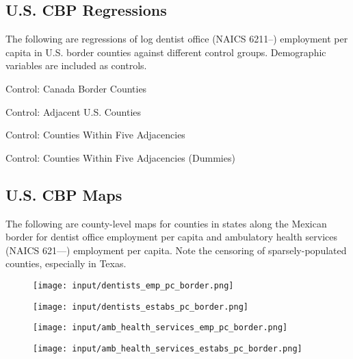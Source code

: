 \subsection{U.S. CBP Regressions}
The following are regressions of log dentist office (NAICS 6211--) employment per capita in U.S. border counties against different control groups.
Demographic variables are included as controls.

\begin{table}[H]
	\caption{Control: Canada Border Counties}
	\centering

\end{table}

\begin{table}[H]
	\caption{Control: Adjacent U.S. Counties}
	\centering

\end{table}

\begin{table}[H]
	\caption{Control: Counties Within Five Adjacencies}
	\centering

\end{table}

\begin{table}[H]
	\caption{Control: Counties Within Five Adjacencies (Dummies)}
	\centering

\end{table}

\subsection{U.S. CBP Maps}
The following are county-level maps for counties in states along the Mexican border for dentist office employment per capita and ambulatory health services (NAICS 621---) employment per capita.
Note the censoring of sparsely-populated counties, especially in Texas.

\begin{figure}[H]
	\centering
	\texttt{[image: input/dentists\_emp\_pc\_border.png]}
\end{figure}

\begin{figure}[H]
	\centering
	\texttt{[image: input/dentists\_estabs\_pc\_border.png]}
\end{figure}

\begin{figure}[H]
	\centering
	\texttt{[image: input/amb\_health\_services\_emp\_pc\_border.png]}
\end{figure}

\begin{figure}[H]
	\centering
	\texttt{[image: input/amb\_health\_services\_estabs\_pc\_border.png]}
\end{figure}
